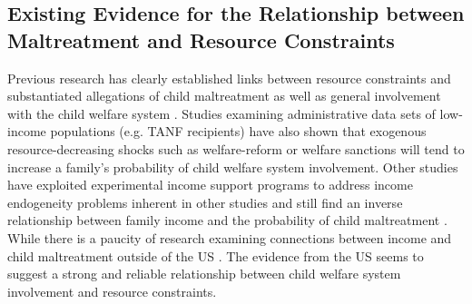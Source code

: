 \documentclass[1p, review]{elsarticle}\usepackage[]{graphicx}\usepackage[]{color}
\begin{document}
\subsection{Existing Evidence for the Relationship between Maltreatment and Resource Constraints}
\label{sec:lit}

Previous research has clearly established links between resource constraints and substantiated allegations of child maltreatment as well as general involvement with the child welfare system \citep{Gil1970, Pelton1981, Pelton1994, Russell1984, Sedlak1996, Stith2009, BergerAndWoldfogel2004}. Studies examining administrative data sets of low-income populations (e.g. TANF recipients) have also shown that exogenous resource-decreasing shocks such as welfare-reform \citep{Courtney2005} or welfare sanctions \citep{Slack2007} will tend to increase a family's probability of child welfare system involvement. Other studies have exploited experimental income support programs to address income endogeneity problems inherent in other studies and still find an inverse relationship between family income and the probability of child maltreatment \citep{Cancian2013, Fein2003}. While there is a paucity of research examining connections between income and child maltreatment outside of the US \citep{Cameron2006}. The evidence from the US seems to suggest a strong and reliable relationship between child welfare system involvement and resource constraints. 
\end{document}
